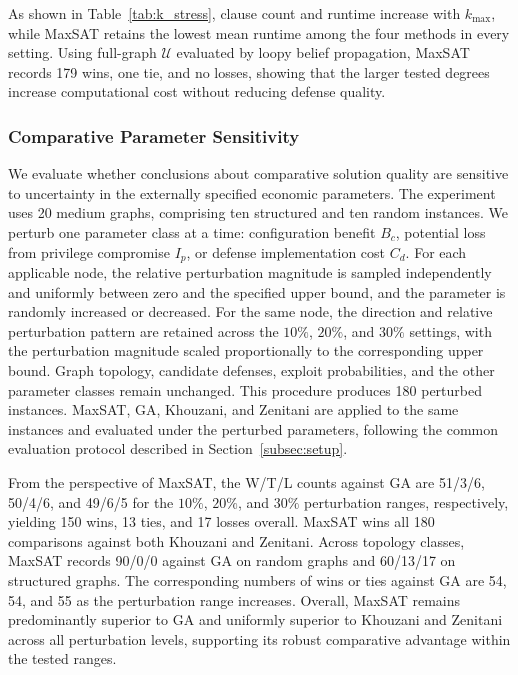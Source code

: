 \documentclass[conference]{IEEEtran}
\theoremstyle{definition} %
\theoremstyle{plain} %
\begin{document}
{As shown in Table~\ref{tab:k_stress}, clause count and runtime increase with \(k_{\max}\), while MaxSAT retains the lowest mean runtime among the four methods in every setting. Using full-graph \(\mathcal{U}\) evaluated by loopy belief propagation, MaxSAT records 179 wins, one tie, and no losses, showing that the larger tested degrees increase computational cost without reducing defense quality.

\subsubsection{Comparative Parameter Sensitivity}
\label{subsec:parameter_sensitivity}

We evaluate whether conclusions about comparative solution quality are sensitive to uncertainty in the externally specified economic parameters. The experiment uses 20 medium graphs, comprising ten structured and ten random instances. We perturb one parameter class at a time: configuration benefit \(B_c\), potential loss from privilege compromise \(I_p\), or defense implementation cost \(C_d\). For each applicable node, the relative perturbation magnitude is sampled independently and uniformly between zero and the specified upper bound, and the parameter is randomly increased or decreased. For the same node, the direction and relative perturbation pattern are retained across the \(10\%\), \(20\%\), and \(30\%\) settings, with the perturbation magnitude scaled proportionally to the corresponding upper bound. Graph topology, candidate defenses, exploit probabilities, and the other parameter classes remain unchanged. This procedure produces 180 perturbed instances. MaxSAT, GA, Khouzani, and Zenitani are applied to the same instances and evaluated under the perturbed parameters, following the common evaluation protocol described in Section~\ref{subsec:setup}.

From the perspective of MaxSAT, the W/T/L counts against GA are 51/3/6, 50/4/6, and 49/6/5 for the \(10\%\), \(20\%\), and \(30\%\) perturbation ranges, respectively, yielding 150 wins, 13 ties, and 17 losses overall. MaxSAT wins all 180 comparisons against both Khouzani and Zenitani. Across topology classes, MaxSAT records 90/0/0 against GA on random graphs and 60/13/17 on structured graphs. The corresponding numbers of wins or ties against GA are 54, 54, and 55 as the perturbation range increases. Overall, MaxSAT remains predominantly superior to GA and uniformly superior to Khouzani and Zenitani across all perturbation levels, supporting its robust comparative advantage within the tested ranges.
}
\end{document}
